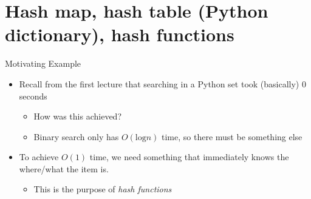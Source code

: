 \documentclass[
  ignorenonframetext,
]{beamer}
\providecommand{\tightlist}{%
  \setlength{\itemsep}{0pt}\setlength{\parskip}{0pt}}\usepackage{longtable,booktabs,array}
\begin{document}
\hypertarget{hash-map-hash-table-python-dictionary-hash-functions}{%
\section{Hash map, hash table (Python dictionary), hash
functions}\label{hash-map-hash-table-python-dictionary-hash-functions}}

\begin{frame}{Motivating Example}
\protect\hypertarget{motivating-example-1}{}
\begin{itemize}
\item
  Recall from the first lecture that searching in a Python set took
  (basically) 0 seconds

  \begin{itemize}
  \item
    How was this achieved?
  \item
    Binary search only has \(O(\text{log}n)\) time, so there must be
    something else
  \end{itemize}
\item
  To achieve \(O(1)\) time, we need something that immediately knows the
  where/what the item is.

  \begin{itemize}
  \tightlist
  \item
    This is the purpose of \emph{hash functions}
  \end{itemize}
\end{itemize}
\end{frame}
\end{document}
